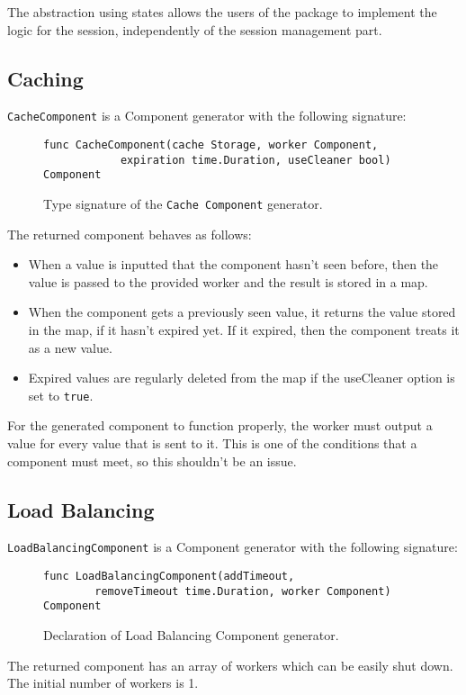 \documentclass[12pt,a4paper]{article}
\begin{document}
The abstraction using states allows the users of the package to implement the
logic for the session, independently of the session management part.

\subsection{Caching}
\texttt{CacheComponent} is a Component generator with the following signature:
\begin{figure}[h]
\centering
\begin{lstlisting}
func CacheComponent(cache Storage, worker Component, 
            expiration time.Duration, useCleaner bool) Component
\end{lstlisting}
\caption[scale=1.0]{Type signature of the \texttt{Cache Component} generator.}
\label{fig:cacheComp}
\end{figure}

The returned component behaves as follows:
\begin{itemize}
	\item When a value is inputted that the component hasn't seen before, then
		  the value is passed to the provided worker and the result is stored in
		  a map.
	\item When the component gets a previously seen value, it returns the value
		  stored in the map, if it hasn't expired yet. If it expired, then the component
		  treats it as a new value.
	\item Expired values are regularly deleted from the map if the useCleaner
          option is set to \texttt{true}.
\end{itemize}

For the generated component to function properly, the worker must output
a value for every value that is sent to it. This is one of the conditions
that a component must meet, so this shouldn't be an issue.

\subsection{Load Balancing}
\texttt{LoadBalancingComponent} is a Component generator with the following signature:
\begin{figure}[h]
\centering
\begin{lstlisting}
func LoadBalancingComponent(addTimeout, 
		removeTimeout time.Duration, worker Component) Component
\end{lstlisting}
\caption[scale=1.0]{Declaration of Load Balancing Component generator.}
\label{fig:loadComp}
\end{figure}
The returned component has an array of workers which can be easily shut down.
The initial number of workers is 1. 
\end{document}
